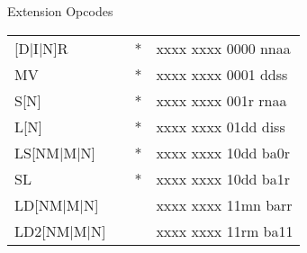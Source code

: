 \documentclass[oneside,english,a4paper,10pt,oneside,openany,final]{memoir}
\begin{document}
\begin{center}
Extension Opcodes
\begin{longtable}{TllT}
[D|I|N]R    &          & *  & xxxx xxxx 0000 nnaa \\
MV          &          & *  & xxxx xxxx 0001 ddss \\
S[N]        &          & *  & xxxx xxxx 001r rnaa \\
L[N]        &          & *  & xxxx xxxx 01dd diss \\
LS[NM|M|N]  &          & *  & xxxx xxxx 10dd ba0r \\
SL          &          & *  & xxxx xxxx 10dd ba1r \\
LD[NM|M|N]  &          &    & xxxx xxxx 11mn barr \\
LD2[NM|M|N] &          &    & xxxx xxxx 11rm ba11
\end{longtable}
\end{center}
\end{document}
